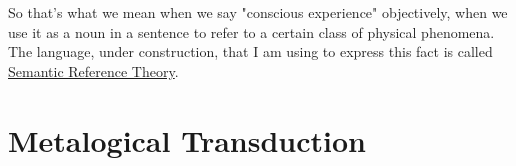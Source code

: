 \documentclass[runningheads]{llncs}
\begin{document}
So that's what we mean when we say "conscious experience" objectively, when we use it as a noun in a sentence to refer to a certain class of physical phenomena. The language, under construction, that I am using to express this fact is called \href{https://dna-platform.github.io/inexplicable-phenomena/encyclopedia/semantic-reference-theory.html}{Semantic Reference Theory}\xspace.

\section{Metalogical Transduction}
% 
% 
% 
% 
% 
% 
% 
\end{document}
